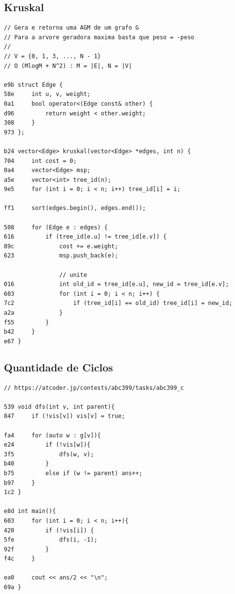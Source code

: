 \documentclass[11pt, a4paper, twoside]{article}
\begin{document}
\subsection{Kruskal}
\begin{lstlisting}
// Gera e retorna uma AGM de um grafo G
// Para a arvore geradora maxima basta que peso = -peso
//
// V = {0, 1, 3, ..., N - 1}
// O (MlogM + N^2) : M = |E|, N = |V|

e9b struct Edge {
58e     int u, v, weight;
0a1     bool operator<(Edge const& other) {
d96         return weight < other.weight;
308     }
973 };

b24 vector<Edge> kruskal(vector<Edge> *edges, int n) {
704     int cost = 0;
0a4     vector<Edge> msp;
a5e     vector<int> tree_id(n);
9e5     for (int i = 0; i < n; i++) tree_id[i] = i;
    
ff1     sort(edges.begin(), edges.end());
    
508     for (Edge e : edges) {
616         if (tree_id[e.u] != tree_id[e.v]) {
89c             cost += e.weight;
623             msp.push_back(e);
    
                // unite
016             int old_id = tree_id[e.u], new_id = tree_id[e.v];
603             for (int i = 0; i < n; i++) {
7c2                 if (tree_id[i] == old_id) tree_id[i] = new_id;
a2a             }
f55         }
b42     }
e67 }
\end{lstlisting}

\subsection{Quantidade de Ciclos}
\begin{lstlisting}
// https://atcoder.jp/contests/abc399/tasks/abc399_c

539 void dfs(int v, int parent){
847     if (!vis[v]) vis[v] = true;
    
fa4     for (auto w : g[v]){
e24         if (!vis[w]){
3f5             dfs(w, v);
b40         }
b75         else if (w != parent) ans++;
b97     }
1c2 }   

e8d int main(){
603     for (int i = 0; i < n; i++){
420         if (!vis[i]) {
5fe             dfs(i, -1);
92f         }
f4c     }
        
ea0     cout << ans/2 << "\n";
69a }
\end{lstlisting}



%
%
\end{document}
